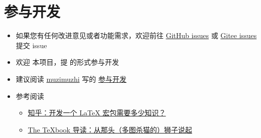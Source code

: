 
\section{参与开发}

\begin{itemize}
  \item 如果您有任何改进意见或者功能需求，欢迎前往 \href{https://github.com/xkwxdyy/exam-zh/issues}{GitHub issues} 或 \href{https://gitee.com/xkwxdyy/exam-zh/issues}{Gitee issues} 提交 issue
  \item 欢迎  本项目，提  的形式参与开发
  \item 建议阅读 \href{https://zhuanlan.zhihu.com/typography-and-latex/}{muzimuzhi} 写的 \href{https://gitee.com/ustctug/ustcthesis/wiki/%E5%8F%82%E4%B8%8E%E5%BC%80%E5%8F%91}{参与开发}
  \item 参考阅读
    \begin{itemize}
      \item \href{https://www.zhihu.com/question/27017364/answer/34932199}{知乎：开发一个 LaTeX 宏包需要多少知识？}
      \item \href{https://zhuanlan.zhihu.com/p/19669122}{The TeXbook 导读：从那头（多图杀猫的）狮子说起}
    \end{itemize}
\end{itemize}